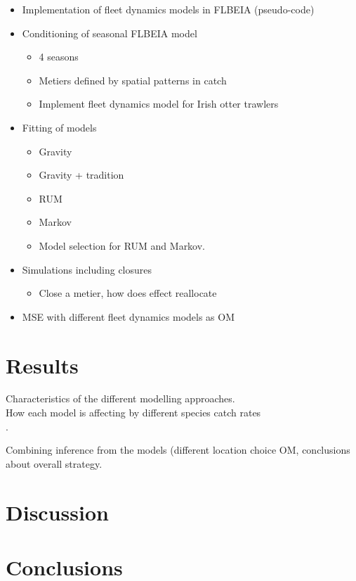 \documentclass[12pt, halfline, a4paper]{ouparticle}
\begin{document}
\begin{itemize}
	\item Implementation of fleet dynamics models in FLBEIA (pseudo-code)
	\item Conditioning of seasonal FLBEIA model
		\begin{itemize}
			\item 4 seasons
			\item Metiers defined by spatial patterns in catch
			\item Implement fleet dynamics model for Irish otter
				trawlers
		\end{itemize}
	\item Fitting of models 
		\begin{itemize}
			\item Gravity
			\item Gravity + tradition
			\item RUM
			\item Markov 
			\item Model selection for RUM and Markov.
		\end{itemize}
	\item Simulations including closures
		\begin{itemize}
			\item Close a metier, how does effect reallocate
		\end{itemize}
	\item MSE with different fleet dynamics models as OM
\end{itemize}

\section{Results}
\label{res}

Characteristics of the different modelling approaches. \\

How each model is affecting by different species catch rates \\.

Combining inference from the models (different location choice OM, conclusions
about overall strategy. \\


\section{Discussion}
\label{dis}

\section{Conclusions}
\label{con}
\end{document}
